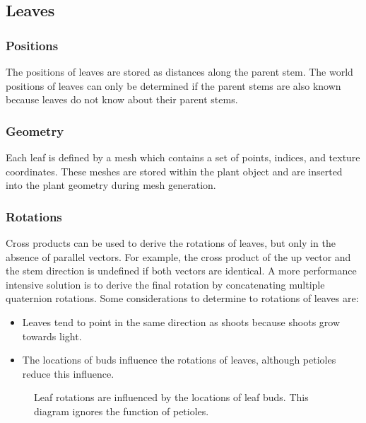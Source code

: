 \documentclass[10pt]{article}
\begin{document}
\subsection{Leaves}

\subsubsection{Positions}

The positions of leaves are stored as distances along the parent stem. The world positions of leaves can only be determined if the parent stems are also known because leaves do not know about their parent stems.

\subsubsection{Geometry}

Each leaf is defined by a mesh which contains a set of points, indices, and texture coordinates. These meshes are stored within the plant object and are inserted into the plant geometry during mesh generation.

\subsubsection{Rotations}

\begin{minipage}[t]{0.6\textwidth}
Cross products can be used to derive the rotations of leaves, but only in the absence of parallel vectors. For example, the cross product of the up vector and the stem direction is undefined if both vectors are identical. A more performance intensive solution is to derive the final rotation by concatenating multiple quaternion rotations. Some considerations to determine to rotations of leaves are:

\begin{itemize}
\item Leaves tend to point in the same direction as shoots because shoots grow towards light.
\item The locations of buds influence the rotations of leaves, although petioles reduce this influence.
\end{itemize}

\end{minipage}
\hfill
\begin{minipage}[t]{0.3\textwidth}
 \begin{figure}[H]
  \centering
  
  \caption{Leaf rotations are influenced by the locations of leaf buds. This diagram ignores the function of petioles.}
 \end{figure}
\end{minipage}
\end{document}
